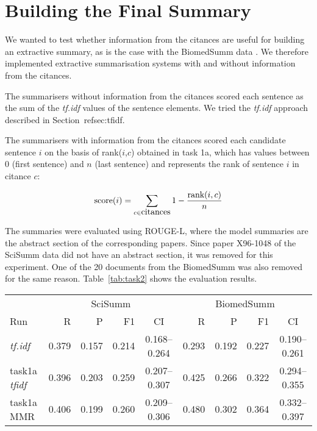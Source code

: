 \documentclass[11pt]{article}
\begin{document}
\section{Building the Final Summary}

We wanted to test whether information from the citances are useful for
building an extractive summary, as is the case with the BiomedSumm
data \cite{Molla:ALTA2014}. We therefore implemented extractive
summarisation systems with and without information from the citances.

The summarisers without information from the citances scored each
sentence as the sum of the \emph{tf.idf} values of the sentence
elements. We tried the \emph{tf.idf} approach described in
Section~ref{sec:tfidf}.

The summarisers with information from the citances scored each
candidate sentence $i$ on the basis of rank($i$,$c$) obtained in task
1a, which has values between 0 (first sentence) and $n$ (last
sentence) and represents the rank of sentence $i$ in citance $c$:

$$
\hbox{score}(i) = \sum_{c\in\hbox{citances}}1-\frac{\hbox{rank}(i,c)}{n}
$$

The summaries were evaluated using ROUGE-L, where the model summaries
are the abstract section of the corresponding papers. Since paper
X96-1048 of the SciSumm data did not have an abstract section, it was
removed for this experiment. One of the 20 documents from
the BiomedSumm was also removed for the same
reason. Table~\ref{tab:task2} shows the evaluation results.

\begin{table*}
  \centering
  \begin{tabular}{l|rrrc|rrrc}
& \multicolumn{4}{|c|}{SciSumm} & \multicolumn{4}{c}{BiomedSumm}\\
Run & R & P & F1 & CI & R & P & F1 & CI\\
\hline
\emph{tf.idf} &  0.379 & 0.157 & 0.214 & 0.168--0.264 & 0.293 & 0.192
& 0.227 & 0.190--0.261\\
\hline
task1a \emph{tfidf} & 0.396 & 0.203 & 0.259 & 0.207--0.307 & 0.425 &
0.266 & 0.322 & 0.294--0.355\\
task1a MMR & 0.406 & 0.199 & 0.260 & 0.209--0.306 & 0.480 & 0.302 & 0.364 & 0.332--0.397\\
  \end{tabular}
  \caption{ROUGE-L results of our runs for task 2}
  \label{tab:task2}
\end{table*}
\end{document}
